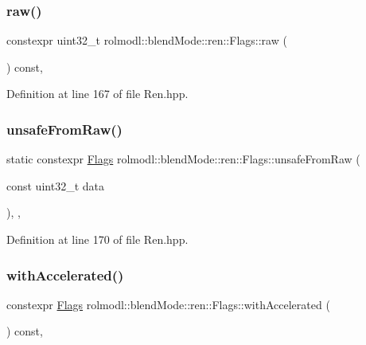\subsubsection{\texorpdfstring{raw()}{raw()}}
{\footnotesize\ttfamily constexpr uint32\+\_\+t rolmodl\+::blend\+Mode\+::ren\+::\+Flags\+::raw (\begin{DoxyParamCaption}{ }\end{DoxyParamCaption}) const\hspace{0.3cm}{\ttfamily [inline]}, {\ttfamily [noexcept]}}



Definition at line 167 of file Ren.\+hpp.

\mbox{\label{structrolmodl_1_1blend_mode_1_1ren_1_1_flags_affd5f9207e462f27e0fd1062424b9fe3}} 
\subsubsection{\texorpdfstring{unsafeFromRaw()}{unsafeFromRaw()}}
{\footnotesize\ttfamily static constexpr \mbox{\hyperlink{structrolmodl_1_1blend_mode_1_1ren_1_1_flags}{Flags}} rolmodl\+::blend\+Mode\+::ren\+::\+Flags\+::unsafe\+From\+Raw (\begin{DoxyParamCaption}\item[{const uint32\+\_\+t}]{data }\end{DoxyParamCaption})\hspace{0.3cm}{\ttfamily [inline]}, {\ttfamily [static]}, {\ttfamily [noexcept]}}



Definition at line 170 of file Ren.\+hpp.

\mbox{\label{structrolmodl_1_1blend_mode_1_1ren_1_1_flags_a1f7aa67e20eff57c306bef7d4444b907}} 
\subsubsection{\texorpdfstring{withAccelerated()}{withAccelerated()}}
{\footnotesize\ttfamily constexpr \mbox{\hyperlink{structrolmodl_1_1blend_mode_1_1ren_1_1_flags}{Flags}} rolmodl\+::blend\+Mode\+::ren\+::\+Flags\+::with\+Accelerated (\begin{DoxyParamCaption}{ }\end{DoxyParamCaption}) const\hspace{0.3cm}{\ttfamily [inline]}, {\ttfamily [noexcept]}}



